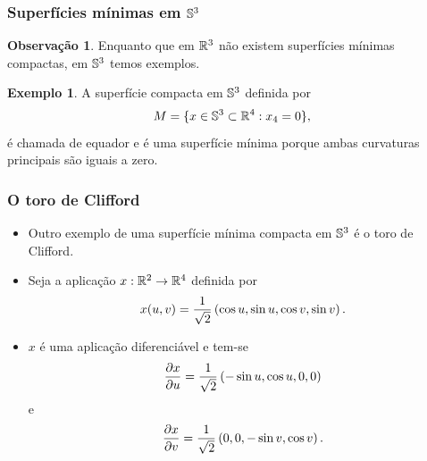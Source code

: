 \documentclass[10pt,a4paper]{beamer}
\theoremstyle{definition}
\newtheorem{definicao}{Definição}
\newtheorem{observacao}{Observação}
\newtheorem{exemplo}{Exemplo}
\begin{document}
\begin{frame}
	\frametitle{Superfícies mínimas em $\mathbb{S}^3$}

	\begin{observacao}
		Enquanto que em $\mathbb R^3$ não existem superfícies mínimas compactas, em $\mathbb{S}^3$ temos exemplos.
	\end{observacao}

	\pause

	\begin{exemplo}
		A superfície compacta em $\mathbb{S}^3$ definida por
		\begin{equation*}
		M = \{ x \in \mathbb{S}^3 \subset \mathbb R^4: x_4 = 0 \},
		\end{equation*}
		é chamada de \alert{equador} e é uma superfície mínima porque ambas curvaturas principais são iguais a zero.
	\end{exemplo}

%	
%		
	 
	
%	
\end{frame}



\begin{frame}
	\frametitle{O toro de Clifford}
	
	\begin{itemize}
		\item Outro exemplo de uma superfície mínima compacta em $\mathbb{S}^3$ é o \alert{toro de Clifford}.
		
		\pause
		
		\item 	Seja a aplicação $x: \mathbb R^2 \rightarrow \mathbb R^4$ definida por
		\begin{equation}\label{def:toro-de-clifford}
		x(u,v) = \frac{1}{\sqrt{2}} \left( \cos u, \sin u, \cos v, \sin v \right).
		\end{equation}
		
		\pause
		
		\item $x$ é uma aplicação diferenciável e tem-se
		\[ \frac{\partial x}{\partial u} = \frac{1}{\sqrt{2}} \left( -\sin u, \cos u, 0, 0 \right) \]
		e
		\[ \frac{\partial x}{\partial v} = \frac{1}{\sqrt{2}} \left( 0,0, -\sin v, \cos v \right). \]
		
		
	\end{itemize}

\end{frame}
\end{document}
